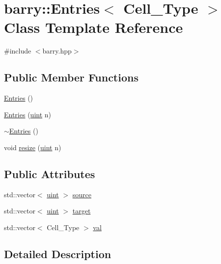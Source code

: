 \hypertarget{classbarry_1_1_entries}{}\section{barry\+:\+:Entries$<$ Cell\+\_\+\+Type $>$ Class Template Reference}
\label{classbarry_1_1_entries}


{\ttfamily \#include $<$barry.\+hpp$>$}

\subsection*{Public Member Functions}
\begin{DoxyCompactItemize}
\item 
\hyperlink{classbarry_1_1_entries_aa51d37ad8e5f441fd64c954dfab9ad04}{Entries} ()
\item 
\hyperlink{classbarry_1_1_entries_a22dda1d0afd4fbe4b658e55ca1b61f16}{Entries} (\hyperlink{namespacebarry_a11dfc53ddb4672278319aa04f1e09a6c}{uint} n)
\item 
\hyperlink{classbarry_1_1_entries_a8d74af4d3b545fb79f9f4e8e894160cb}{$\sim$\+Entries} ()
\item 
void \hyperlink{classbarry_1_1_entries_a0c1e6fb0a6e2c462ba782433ac11e026}{resize} (\hyperlink{namespacebarry_a11dfc53ddb4672278319aa04f1e09a6c}{uint} n)
\end{DoxyCompactItemize}
\subsection*{Public Attributes}
\begin{DoxyCompactItemize}
\item 
std\+::vector$<$ \hyperlink{namespacebarry_a11dfc53ddb4672278319aa04f1e09a6c}{uint} $>$ \hyperlink{classbarry_1_1_entries_a5992282ca5f39dbbbd4195d7176b6295}{source}
\item 
std\+::vector$<$ \hyperlink{namespacebarry_a11dfc53ddb4672278319aa04f1e09a6c}{uint} $>$ \hyperlink{classbarry_1_1_entries_a07de39535af23bc1f9e3918b32a39b18}{target}
\item 
std\+::vector$<$ Cell\+\_\+\+Type $>$ \hyperlink{classbarry_1_1_entries_af2570fcd2f42e9a1704f9c254507284c}{val}
\end{DoxyCompactItemize}


\subsection{Detailed Description}

